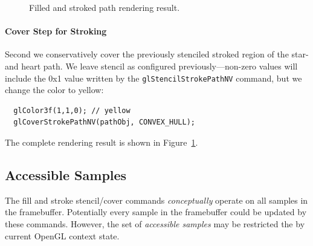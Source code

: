 \begin{figure}[tb]
  \caption{\label{fig:star-and-heart} Filled and stroked path rendering result.}
\end{figure}

\paragraph{Cover Step for Stroking}

Second we conservatively cover the previously stenciled stroked
region of the star-and heart path.  We leave stencil as configured
previously---non-zero values will include the 0x1 value written by the
{\tt glStencilStrokePathNV} command, but we change the color to yellow:
\begin{lstlisting}
  glColor3f(1,1,0); // yellow
  glCoverStrokePathNV(pathObj, CONVEX_HULL);
\end{lstlisting}
The complete rendering result is shown in Figure~\ref{fig:star-and-heart}.

\subsection{Accessible Samples}

The fill and stroke stencil/cover commands {\em conceptually} operate
on all samples in the framebuffer.  Potentially every sample in the
framebuffer could be updated by these commands.  However, the set of {\em
accessible samples} may be restricted the by current OpenGL context state.

